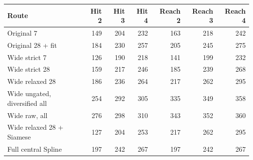 \begin{tabular}{lrrrrrr}
\toprule
Route & Hit 2 & Hit 3 & Hit 4 & Reach 2 & Reach 3 & Reach 4 \\
\midrule
Original 7 & 149 & 204 & 232 & 163 & 218 & 242 \\
Original 28 + fit & 184 & 230 & 257 & 205 & 245 & 275 \\
Wide strict 7 & 126 & 190 & 218 & 141 & 199 & 232 \\
Wide strict 28 & 159 & 217 & 246 & 185 & 239 & 268 \\
Wide relaxed 28 & 186 & 236 & 264 & 217 & 262 & 295 \\
Wide ungated, diversified all & 254 & 292 & 305 & 335 & 349 & 358 \\
Wide raw, all & 276 & 298 & 310 & 343 & 352 & 360 \\
Wide relaxed 28 + Siamese & 127 & 204 & 253 & 217 & 262 & 295 \\
Full central Spline & 197 & 242 & 267 & 197 & 242 & 267 \\
\bottomrule
\end{tabular}
